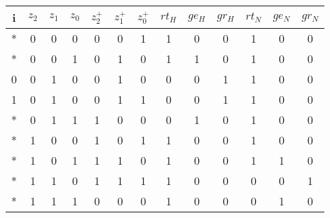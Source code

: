 \documentclass[10pt,a4paper,oneside,ngerman,numbers=noenddot]{scrartcl}
\begin{document}
\subsection{} %
\begin{tabular}{c|ccc||ccc|ccc|ccc}
i & $z_{2}$ & $z_{1}$ & $z_{0}$ & $z_{2}^{+}$ & $z_{1}^{+}$ & $z_{0}^{+}$ & $rt_{H}$ & $ge_{H}$ & $gr_{H}$ & $rt_{N}$ & $ge_{N}$ & $gr_{N}$\\
\hline
* & 0 & 0 & 0 & 0 & 0 & 1 & 1 & 0 & 0 & 1 & 0 & 0\\
* & 0 & 0 & 1 & 0 & 1 & 0 & 1 & 1 & 0 & 1 & 0 & 0\\
0 & 0 & 1 & 0 & 0 & 1 & 0 & 0 & 0 & 1 & 1 & 0 & 0\\
1 & 0 & 1 & 0 & 0 & 1 & 1 & 0 & 0 & 1 & 1 & 0 & 0\\
* & 0 & 1 & 1 & 1 & 0 & 0 & 0 & 1 & 0 & 1 & 0 & 0\\
* & 1 & 0 & 0 & 1 & 0 & 1 & 1 & 0 & 0 & 1 & 0 & 0\\
* & 1 & 0 & 1 & 1 & 1 & 0 & 1 & 0 & 0 & 1 & 1 & 0\\
* & 1 & 1 & 0 & 1 & 1 & 1 & 1 & 0 & 0 & 0 & 0 & 1\\
* & 1 & 1 & 1 & 0 & 0 & 0 & 1 & 0 & 0 & 0 & 1 & 0
\end{tabular}
\end{document}
